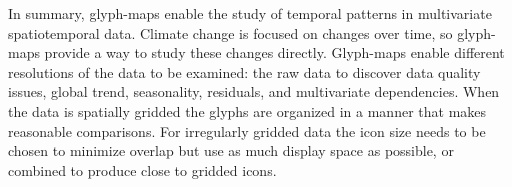 \documentclass[oneside]{article}
\begin{document}
In summary, glyph-maps enable the study of temporal patterns in multivariate spatiotemporal data. Climate change is focused on changes over time, so glyph-maps provide a way to study these changes directly. Glyph-maps enable different resolutions of the data to be examined: the raw data to discover data quality issues, global trend, seasonality, residuals, and multivariate dependencies. When the data is spatially gridded the glyphs are organized in a manner that makes reasonable comparisons. For irregularly gridded data the icon size needs to be chosen to minimize overlap but use as much display space as possible, or combined to produce close to gridded icons. 




\end{document}
